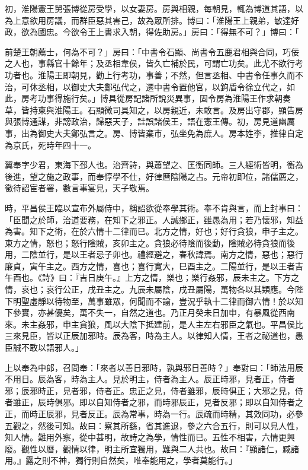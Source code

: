 \begin{pinyinscope}
初，淮陽憲王舅張博從房受學，以女妻房。房與相親，每朝見，輒為博道其語，以為上意欲用房議，而群臣惡其害己，故為眾所排。博曰：「淮陽王上親弟，敏達好政，欲為國忠。今欲令王上書求入朝，得佐助房。」房曰：「得無不可？」博曰：「

前楚王朝薦士，何為不可？」房曰：「中書令石顯、尚書令五鹿君相與合同，巧佞之人也，事縣官十餘年；及丞相韋侯，皆久亡補於民，可謂亡功矣。此尤不欲行考功者也。淮陽王即朝見，勸上行考功，事善；不然，但言丞相、中書令任事久而不治，可休丞相，以御史大夫鄭弘代之，遷中書令置他官，以鉤盾令徐立代之，如此，房考功事得施行矣。」博具從房記諸所說災異事，固令房為淮陽王作求朝奏草，皆持柬與淮陽王。石顯微司具知之，以房親近，未敢言。及房出守郡，顯告房與張博通謀，非謗政治，歸惡天子，詿誤諸侯王，語在憲王傳。初，房見道幽厲事，出為御史大夫鄭弘言之。房、博皆棄巿，弘坐免為庶人。房本姓李，推律自定為京氏，死時年四十一。

翼奉字少君，東海下邳人也。治齊詩，與蕭望之、匡衡同師。三人經術皆明，衡為後進，望之施之政事，而奉惇學不仕，好律曆陰陽之占。元帝初即位，諸儒薦之，徵待詔宦者署，數言事宴見，天子敬焉。

時，平昌侯王臨以宣布外屬侍中，稱詔欲從奉學其術。奉不肯與言，而上封事曰：「臣聞之於師，治道要務，在知下之邪正。人誠鄉正，雖愚為用；若乃懷邪，知益為害。知下之術，在於六情十二律而已。北方之情，好也；好行貪狼，申子主之。東方之情，怒也；怒行陰賊，亥卯主之。貪狼必待陰而後動，陰賊必待貪狼而後用，二陰並行，是以王者忌子卯也。禮經避之，春秋諱焉。南方之情，惡也；惡行廉貞，寅午主之。西方之情，喜也；喜行寬大，巳酉主之。二陽並行，是以王者吉午酉也。《詩》曰：『吉日庚午。』上方之情，樂也；樂行姦邪，辰未主之。下方之情，哀也；哀行公正，戌丑主之。九辰未屬陰，戌丑屬陽，萬物各以其類應。今陛下明聖虛靜以待物至，萬事雖眾，何聞而不諭，豈況乎執十二律而御六情！於以知下參實，亦甚優矣，萬不失一，自然之道也。乃正月癸未日加申，有暴風從西南來。未主姦邪，申主貪狼，風以大陰下抵建前，是人主左右邪臣之氣也。平昌侯比三來見臣，皆以正辰加邪時。辰為客，時為主人。以律知人情，王者之祕道也，愚臣誠不敢以語邪人。」

上以奉為中郎，召問奉：「來者以善日邪時，孰與邪日善時？」奉對曰：「師法用辰不用日。辰為客，時為主人。見於明主，侍者為主人。辰正時邪，見者正，侍者邪；辰邪時正，見者邪，侍者正。忠正之見，侍者雖邪，辰時俱正；大邪之見，侍者雖正，辰時俱邪。即以自知侍者之邪，而時邪辰正，見者反邪；即以自知侍者之正，而時正辰邪，見者反正。辰為常事，時為一行。辰疏而時精，其效同功，必參五觀之，然後可知。故曰：察其所繇，省其進退，參之六合五行，則可以見人性，知人情。難用外察，從中甚明，故詩之為學，情性而已。五性不相害，六情更興廢。觀性以曆，觀情以律，明主所宜獨用，難與二人共也。故曰：『顯諸仁，臧諸用。』露之則不神，獨行則自然矣，唯奉能用之，學者莫能行。」


\end{pinyinscope}
